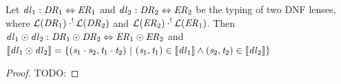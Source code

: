 \documentclass[numbers]{sigplanconf}
\begin{document}
\begin{lemma}
  \label{lem:typ_sem_swap}
  Let $\mathit{dl}_1 : \mathit{DR}_1 \Leftrightarrow \mathit{ER}_1$ and
  $\mathit{dl}_2 : \mathit{DR}_2 \Leftrightarrow \mathit{ER}_2$ be the typing of
  two DNF lenses, where
  $\mathcal{L}(\mathit{DR}_1) \cdot^! \mathcal{L}(\mathit{DR}_2)$ and
  $\mathcal{L}(\mathit{ER}_2) \cdot^! \mathcal{L}(\mathit{ER}_1)$.
  Then $\mathit{dl}_1\odot\mathit{dl}_2 :
  \mathit{DR}_1\odot\mathit{DR}_2 \Leftrightarrow
  \mathit{ER}_1\odot\mathit{ER}_2$ and
  $[ \! [\mathit{dl}_1\odot\mathit{dl}_2] \! ] =
  \{(\mathit{s}_1\cdot\mathit{s}_2,\mathit{t}_1\cdot\mathit{t}_2) ~|~
    (\mathit{s}_1,\mathit{t}_1)\in[ \! [\mathit{dl}_1] \! ]
    \wedge(\mathit{s}_2,\mathit{t}_2)\in[ \! [\mathit{dl}_2] \! ]\}$
\end{lemma}
\begin{proof}
  TODO:
\end{proof}
\end{document}
